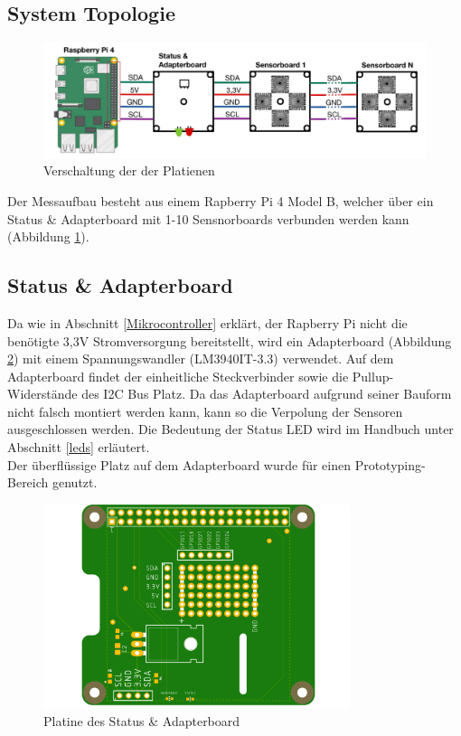 \subsection{System Topologie}
\begin{figure}[H]
\centering
\includegraphics[width=1\textwidth]{img/System-Topologie.png}
\caption{Verschaltung der der Platienen \cite{raspberrypi_fundation}}
\label{fig:Verschaltung_der_P}
\end{figure}

Der Messaufbau besteht aus einem Rapberry Pi 4 Model B, welcher über ein Status \& Adapterboard mit 1-10 Sensnorboards verbunden werden kann (Abbildung \ref{fig:Verschaltung_der_P}).


\subsection{Status \& Adapterboard}
Da wie in Abschnitt \ref{Mikrocontroller} erklärt, der Rapberry Pi nicht die benötigte 3,3V Stromversorgung bereitstellt, wird ein Adapterboard (Abbildung \ref{fig:Adapter-Shield}) mit einem Spannungswandler (LM3940IT-3.3) verwendet.
Auf dem Adapterboard findet der einheitliche Steckverbinder sowie die Pullup-Widerstände des I2C Bus Platz. Da das Adapterboard aufgrund seiner Bauform nicht falsch montiert werden kann, kann so die Verpolung der Sensoren ausgeschlossen werden.
Die Bedeutung der Status LED wird im Handbuch unter Abschnitt \ref{leds} erläutert.\\ 
Der überflüssige Platz auf dem Adapterboard wurde für einen Prototyping-Bereich genutzt.

\begin{figure}[H]
\centering
\includegraphics[width=0.8\textwidth]{img/pi-shield}
\caption{Platine des Status \& Adapterboard}
\label{fig:Adapter-Shield}
\end{figure}

